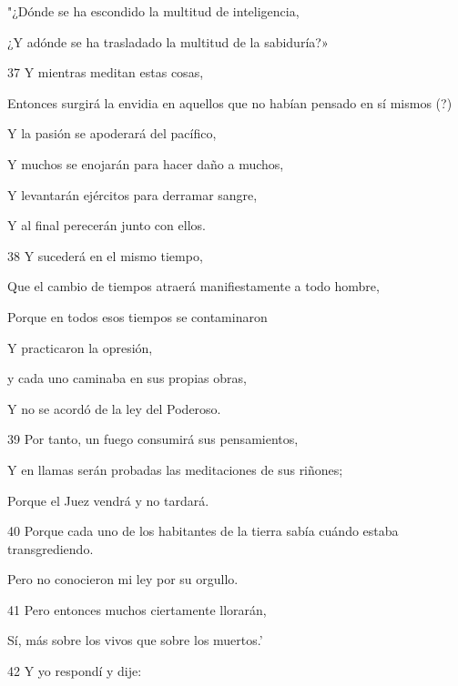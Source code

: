 \par "¿Dónde se ha escondido la multitud de inteligencia,

¿Y adónde se ha trasladado la multitud de la sabiduría?»

\par 37 Y mientras meditan estas cosas,

\par Entonces surgirá la envidia en aquellos que no habían pensado en sí mismos (?)

\par Y la pasión se apoderará del pacífico,

Y muchos se enojarán para hacer daño a muchos,

Y levantarán ejércitos para derramar sangre,

Y al final perecerán junto con ellos.

\par 38 Y sucederá en el mismo tiempo,

\par Que el cambio de tiempos atraerá manifiestamente a todo hombre,

\par Porque en todos esos tiempos se contaminaron

\par Y practicaron la opresión,

\par y cada uno caminaba en sus propias obras,

\par Y no se acordó de la ley del Poderoso.

\par 39 Por tanto, un fuego consumirá sus pensamientos,

Y en llamas serán probadas las meditaciones de sus riñones;

\par Porque el Juez vendrá y no tardará.

\par 40 Porque cada uno de los habitantes de la tierra sabía cuándo estaba transgrediendo.

Pero no conocieron mi ley por su orgullo.

\par 41 Pero entonces muchos ciertamente llorarán,

\par Sí, más sobre los vivos que sobre los muertos.'

\par 42 Y yo respondí y dije:

